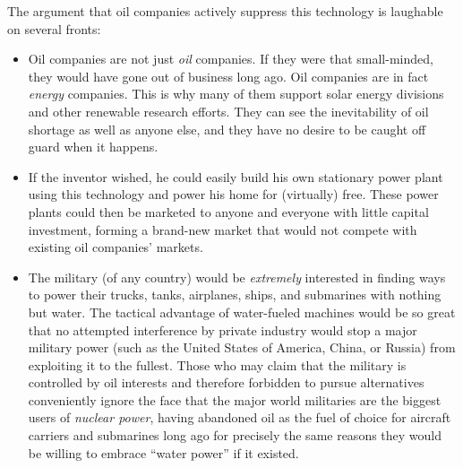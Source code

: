\vskip 10pt

The argument that oil companies actively suppress this technology is laughable on several fronts:

\begin{itemize}
\item{} Oil companies are not just {\it oil} companies.  If they were that small-minded, they would have gone out of business long ago.  Oil companies are in fact {\it energy} companies.  This is why many of them support solar energy divisions and other renewable research efforts.  They can see the inevitability of oil shortage as well as anyone else, and they have no desire to be caught off guard when it happens.
\vskip 5pt
\item{} If the inventor wished, he could easily build his own stationary power plant using this technology and power his home for (virtually) free.  These power plants could then be marketed to anyone and everyone with little capital investment, forming a brand-new market that would not compete with existing oil companies' markets.
\vskip 5pt
\item{} The military (of any country) would be {\it extremely} interested in finding ways to power their trucks, tanks, airplanes, ships, and submarines with nothing but water.  The tactical advantage of water-fueled machines would be so great that no attempted interference by private industry would stop a major military power (such as the United States of America, China, or Russia) from exploiting it to the fullest.  Those who may claim that the military is controlled by oil interests and therefore forbidden to pursue alternatives conveniently ignore the face that the major world militaries are the biggest users of {\it nuclear power}, having abandoned oil as the fuel of choice for aircraft carriers and submarines long ago for precisely the same reasons they would be willing to embrace ``water power'' if it existed.
\end{itemize}











